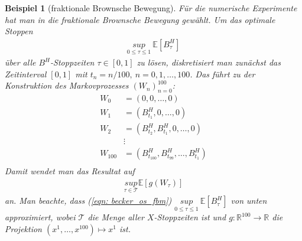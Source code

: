 \documentclass[12pt,titlepage,headsepline]{article}
\newtheorem{beispiel}[definition]{Beispiel}
\begin{document}
      \begin{beispiel}[fraktionale Brownsche Bewegung]\label{bsp: becker_fbm}
        \textup{
        Für die numerische Experimente hat man in \cite{becker_deep_2019} die fraktionale Brownsche Bewegung gewählt.
        Um das optimale Stoppen
        \begin{align*}
          \underset{0\leq \tau \leq 1}{sup} \ \mathbb{E}[B_{\tau}^H]
        \end{align*}
        über alle $B^H$-Stoppzeiten $\tau \in [0,1]$ zu lösen, diskretisiert man zunächst das Zeitinterval $[0,1]$ mit $t_n=n/100, \ n=0,1,\ldots,100$. Das führt zu der Konstruktion des Markovprozesses $(W_n)_{n=0}^{100}$:
        \begin{align*}
          W_0 &= (0,0,\ldots,0) \\
          W_1 &= (B_{t_1}^H,0,\ldots,0) \\
          W_2 &= (B_{t_2}^H,B_{t_1}^H,0,\ldots,0) \\
          & \vdots \\
          W_{100} &= (B_{t_{100}}^H,B_{t_{99}}^H,\ldots,B_{t_1}^H) \\
        \end{align*}
        Damit wendet man das Resultat auf
        \begin{align}\label{eqn: becker_os_fbm}
          \underset{\tau \in \mathcal{T}}{sup} \mathbb{E}[g(W_{\tau})]
        \end{align}
        an. Man beachte, dass (\ref{eqn: becker_os_fbm}) $\underset{0\leq \tau \leq 1}{sup} \ \mathbb{E}[B_{\tau}^H]$ von unten approximiert, wobei $\mathcal{T}$ die Menge aller $X$-Stoppzeiten ist und $g:\mathbb{R}^{100} \rightarrow \mathbb{R}$ die Projektion $(x^1,\ldots,x^{100}) \mapsto x^1$ ist.
        }
      \end{beispiel}
\end{document}
